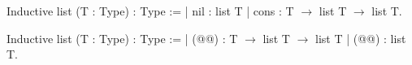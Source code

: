 Inductive list (T : Type) : Type :=
| nil : list T
| cons :  T $\rightarrow$ list T $\rightarrow$ list T.

Inductive list (T : Type) : Type :=
| (@@) : T $\rightarrow$ list T $\rightarrow$ list T
| (@@) : list T.


